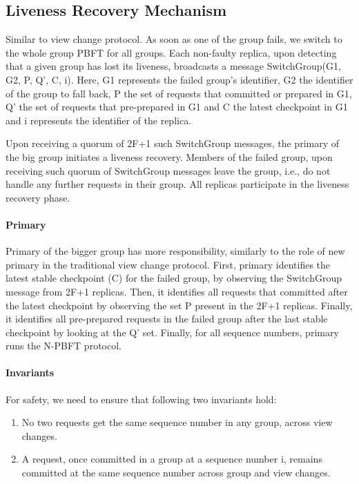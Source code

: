 \documentclass[twocolumn,10pt]{article}
\begin{document}
\subsection{Liveness Recovery Mechanism} Similar to view change protocol. 
As soon as one of the group fails, we switch to the whole group PBFT for all
groups. Each non-faulty replica, upon detecting that a given group
has lost its liveness, broadcasts a message SwitchGroup(G1, G2, P, Q', C, i). 
Here, G1 represents the failed group's identifier, G2 the identifier of the group
to fall back, P the set of requests that committed or prepared in G1, Q' the set of
requests that pre-prepared in G1 and C the latest checkpoint in G1 and i represents
the identifier of the replica.

Upon receiving a quorum of 2F+1 such SwitchGroup messages, the primary of the
big group initiates a liveness recovery. Members of the failed group, upon receiving
such quorum of SwitchGroup messages leave the group, i.e., do not handle any further
requests in their group. All replicas participate in the liveness recovery phase.

\paragraph{Primary}
Primary of the bigger group has more responsibility, similarly to the role of new
primary in the traditional view change protocol. First, primary identifies the latest
stable checkpoint (C) for the failed group, by observing the SwitchGroup message
from 2F+1 replicas. Then, it identifies all requests that committed after the latest
checkpoint by observing the set P present in the 2F+1 replicas. Finally, it identifies
all pre-prepared requests in the failed group after the last stable checkpoint by
looking at the Q' set. Finally, for all sequence numbers, primary runs the N-PBFT protocol.

\paragraph{Invariants} For safety, we need to ensure that following two invariants hold:
\begin{enumerate}
\item{} No two requests get the same sequence number in any group, across view changes.
\item{} A request, once committed in a group at a sequence number i, remains committed at the 
same sequence number across group and view changes.
\end{enumerate}
\end{document}
